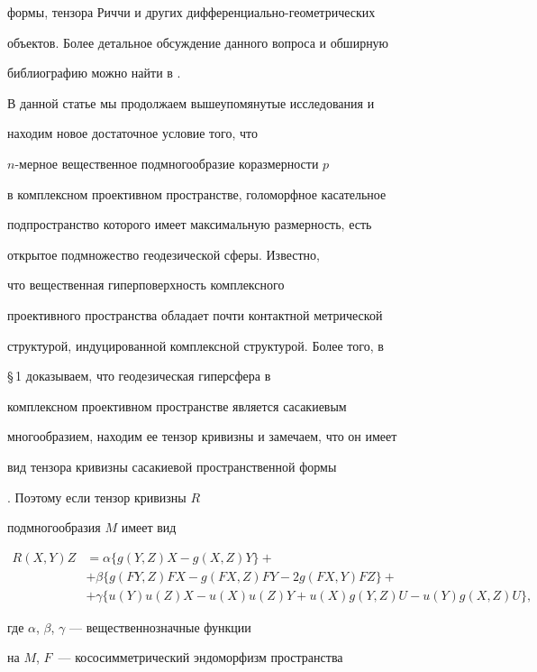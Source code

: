 формы, тензора Риччи и других дифференциально-геометрических


объектов. Более детальное обсуждение данного вопроса и обширную


библиографию можно найти в \cite{NirWells}.








В данной статье мы продолжаем вышеупомянутые исследования и


находим новое достаточное условие того, что


$n$-мерное вещественное подмногообразие коразмерности $p$


в комплексном проективном пространстве, голоморфное касательное


подпространство которого имеет максимальную размерность, есть


открытое подмножество геодезической сферы. Известно, 


что вещественная гиперповерхность комплексного


проективного пространства обладает почти контактной метрической


структурой, индуцированной комплексной структурой. Более того, в


\S\,1 доказываем, что геодезическая гиперсфера в


комплексном проективном пространстве является сасакиевым


многообразием, находим ее тензор кривизны и замечаем, что он имеет


вид тензора кривизны сасакиевой пространственной формы


\cite{Blair}. Поэтому если тензор кривизны $R$


подмногообразия $M$ имеет  вид


\begin{align*}


R(X,Y)Z&=\alpha\{g(Y,Z)X-g(X,Z)Y\}+\\


&+\beta\{g(FY,Z)FX-g(FX,Z)FY-2g(FX,Y)FZ\}+ \\


&+\gamma\{u(Y)u(Z)X-u(X)u(Z)Y+u(X)g(Y,Z)U-u(Y)g(X,Z)U\},


\end{align*}


где $\alpha$, $\beta$, $\gamma$ --- вещественнозначные функции


на $M$, $F$~--- кососимметрический эндоморфизм пространства


